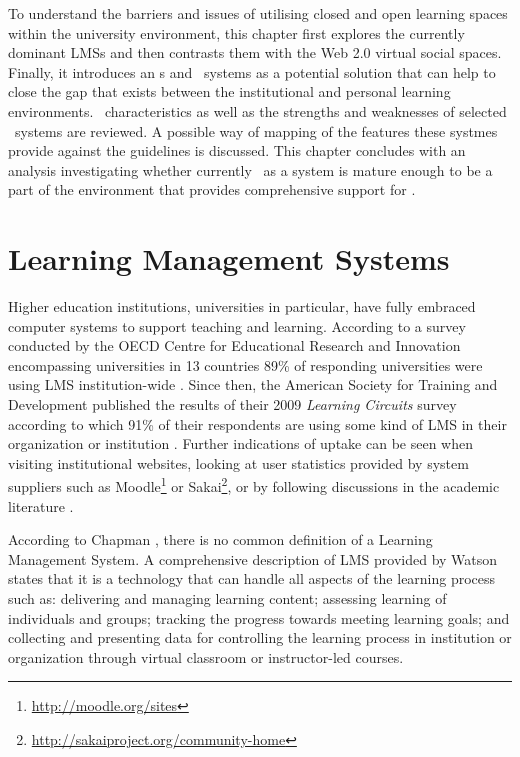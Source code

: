 To understand the barriers and issues of utilising closed and open learning
spaces within the university environment, this chapter first explores the
currently dominant LMSs and then contrasts them with the Web 2.0 virtual social
spaces. Finally, it introduces an \ep s and \ep~systems as a potential solution
that can help to close the gap that exists between the institutional and
personal learning environments. \ep~characteristics as well as the strengths and
weaknesses of selected \ep~systems are reviewed. A possible way of mapping of
the features these systmes provide against the \LLLs guidelines is discussed.
This chapter concludes with an analysis investigating whether currently \ep~as a
system is mature enough to be a part of the environment that provides
comprehensive support for \LLLsn.

\section{Learning Management Systems}
Higher education institutions, universities in particular, have fully embraced
computer systems to support teaching and learning. According to a survey
conducted by the OECD Centre for Educational Research and Innovation
encompassing universities in 13 countries 89\% of responding universities were
using LMS institution-wide \citep{OECD2005}. Since then, the American Society
for Training and Development published the results of their 2009
\textit{Learning Circuits} survey according to which 91\% of their respondents
are using some kind of LMS in their organization or institution
\citep{Ellis2009}. Further indications of uptake can be seen when visiting
institutional websites, looking at user statistics provided by system suppliers
such as Moodle\footnote{\url{http://moodle.org/sites}} or
Sakai\footnote{\url{http://sakaiproject.org/community-home}}, or by following
discussions in the academic literature \citep{Browne2006,Collis2004}.

According to Chapman \citeyearpar{Chapman2009}, there is no common definition of
a Learning Management System. A comprehensive description of LMS provided by
Watson \citeyearpar{Watson2007} states that it is a technology that can handle
all aspects of the learning process such as: delivering and managing learning
content; assessing learning of individuals and groups; tracking the progress
towards meeting learning goals; and collecting and presenting data for
controlling the learning process in institution or organization through virtual
classroom or instructor-led courses.

